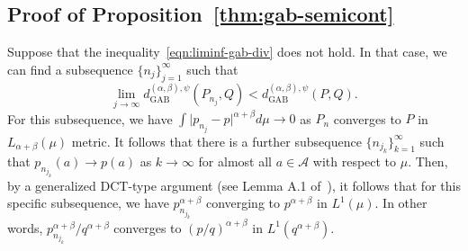 \documentclass[11pt]{article}
\theoremstyle{plain}
\theoremstyle{remark}
\newcommand{\Acal}{\mathcal{A}}
\newcommand{\dGAB}{d_{\mathrm{GAB}}}
\begin{document}
\subsection{Proof of Proposition~\ref{thm:gab-semicont}}

Suppose that the inequality~\eqref{eqn:liminf-gab-div} does not hold. In that case, we can find a subsequence $\{ n_j\}_{j=1}^\infty$ such that
\begin{equation}
    \lim_{j\rightarrow \infty} \dGAB^{(\alpha,\beta),\psi}(P_{n_j}, Q) < \dGAB^{(\alpha,\beta),\psi}(P, Q).
    \label{eqn:semicont-proof-1}
\end{equation}
\noindent For this subsequence, we have $\int \vert p_{n_j} - p\vert^{\alpha+\beta}d\mu \rightarrow 0$ as $P_n$ converges to $P$ in $L_{\alpha+\beta}(\mu)$ metric. It follows that there is a further subsequence $\{ n_{j_k} \}_{k=1}^\infty$ such that $p_{n_{j_k}}(a) \rightarrow p(a)$ as $k \rightarrow \infty$ for almost all $a \in \Acal$ with respect to $\mu$. Then, by a generalized DCT-type argument (see Lemma A.1 of~\cite{roy2026asymptotic}), it follows that for this specific subsequence, we have $p_{n_{j_k}}^{\alpha+\beta}$ converging to $p^{\alpha+\beta}$ in $L^1(\mu)$. In other words, $p_{n_{j_k}}^{\alpha+\beta}/q^{\alpha+\beta}$ converges to $(p/q)^{\alpha+\beta}$ in $L^1(q^{\alpha+\beta})$.
\end{document}
